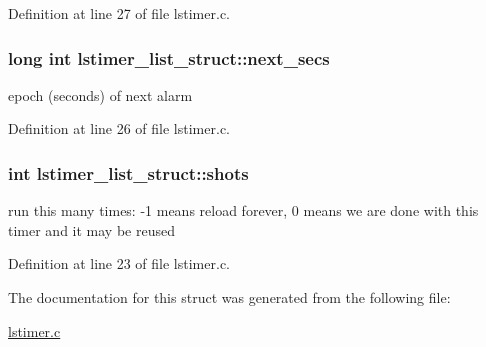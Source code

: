 Definition at line 27 of file lstimer.\-c.

\hypertarget{structlstimer__list__struct_a6a7538fafa77c5769c8dd2bdd34500b7}{
\subsubsection[{next\-\_\-secs}]{\setlength{\rightskip}{0pt plus 5cm}long int lstimer\-\_\-list\-\_\-struct\-::next\-\_\-secs}}\label{structlstimer__list__struct_a6a7538fafa77c5769c8dd2bdd34500b7}


epoch (seconds) of next alarm 



Definition at line 26 of file lstimer.\-c.

\hypertarget{structlstimer__list__struct_ac7ab4cd1f3065156f95b49e66bf05283}{
\subsubsection[{shots}]{\setlength{\rightskip}{0pt plus 5cm}int lstimer\-\_\-list\-\_\-struct\-::shots}}\label{structlstimer__list__struct_ac7ab4cd1f3065156f95b49e66bf05283}


run this many times\-: -\/1 means reload forever, 0 means we are done with this timer and it may be reused 



Definition at line 23 of file lstimer.\-c.



The documentation for this struct was generated from the following file\-:\begin{DoxyCompactItemize}
\item 
\hyperlink{lstimer_8c}{lstimer.\-c}\end{DoxyCompactItemize}

